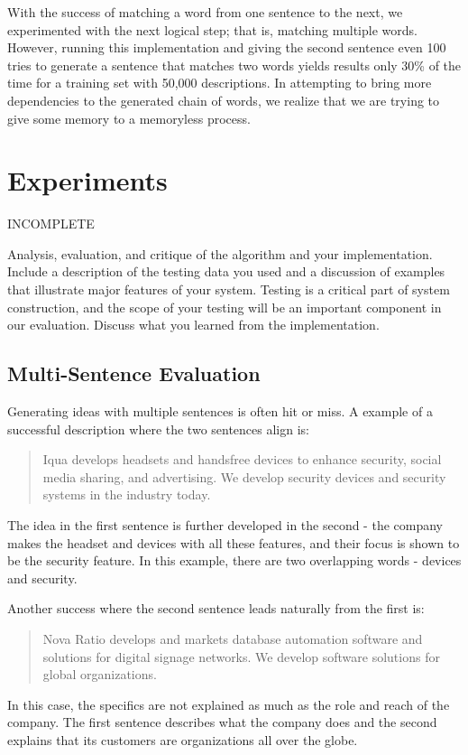 \documentclass[11pt]{article}
\begin{document}
With the success of matching a word from one sentence to the next, we experimented with the next logical step; that is, matching multiple words. However, running this implementation and giving the second sentence even 100 tries to generate a sentence that matches two words yields results only 30\% of the time for a training set with 50,000 descriptions. In attempting to bring more dependencies to the generated chain of words, we realize that we are trying to give some memory to a memoryless process.

\section{Experiments}
INCOMPLETE

Analysis, evaluation, and critique of the algorithm and your
implementation. Include a description of the testing data you used and
a discussion of examples that illustrate major features of your
system. Testing is a critical part of system construction, and the
scope of your testing will be an important component in our
evaluation. Discuss what you learned from the implementation.

\subsection{Multi-Sentence Evaluation}

Generating ideas with multiple sentences is often hit or miss. A example of a successful description where the two sentences align is: 
\begin{quote} 
Iqua develops headsets and handsfree devices to enhance security, social media sharing, and advertising. We develop security devices and security systems in the industry today.
\end{quote}
The idea in the first sentence is further developed in the second - the company makes the headset and devices with all these features, and their focus is shown to be the security feature. In this example, there are two overlapping words - devices and security. 

Another success where the second sentence leads naturally from the first is:
\begin{quote}
Nova Ratio develops and markets database automation software and solutions for digital signage networks. We develop software solutions for global organizations.
\end{quote}
In this case, the specifics are not explained as much as the role and reach of the company. The first sentence describes what the company does and the second explains that its customers are organizations all over the globe.
\end{document}
